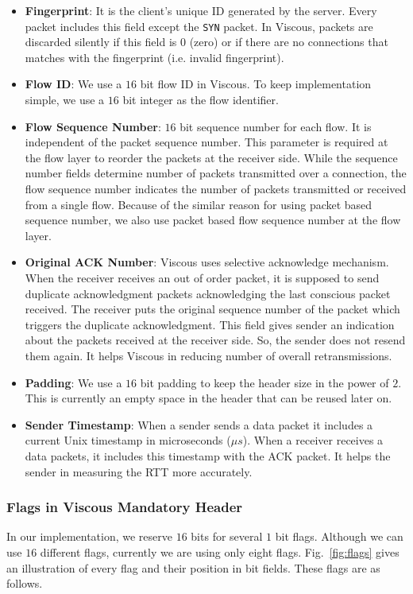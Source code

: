 \begin{itemize}
    \item \textbf{Fingerprint}: It is the client's unique ID generated by the server. Every packet includes this field except the \texttt{SYN} packet. In Viscous, packets are discarded silently if this field is 0 (zero) or if there are no connections that matches with the fingerprint (i.e. invalid fingerprint).
    
    \item \textbf{Flow ID}: We use a $16$ bit flow ID in Viscous. To keep implementation simple, we use a $16$ bit integer as the flow identifier.
    
    \item \textbf{Flow Sequence Number}: $16$ bit sequence number for each flow. It is independent of the packet sequence number. This parameter is required at the flow layer to reorder the packets at the receiver side. While the sequence number fields determine number of packets transmitted over a connection, the flow sequence number indicates the number of packets transmitted or received from a single flow. Because of the similar reason for using packet based sequence number, we also use packet based flow sequence number at the flow layer.
    
    \item \textbf{Original ACK Number}: Viscous uses selective acknowledge mechanism. When the receiver receives an out of order packet, it is supposed to send duplicate acknowledgment packets acknowledging the last conscious packet received. The receiver puts the original sequence number of the packet which triggers the duplicate acknowledgment. This field gives sender an indication about the packets received at the receiver side. So, the sender does not resend them again. It helps Viscous in reducing number of overall retransmissions.
    
    \item \textbf{Padding}: We use a $16$ bit padding to keep the header size in the power of $2$. This is currently an empty space in the header that can be reused later on. 
    
    \item \textbf{Sender Timestamp}: When a sender sends a data packet it includes a current Unix timestamp in microseconds ($\mu s$). When a receiver receives a data packets, it includes this timestamp with the ACK packet. It helps the sender in measuring the RTT more accurately.
\end{itemize}

\subsubsection{Flags in Viscous Mandatory Header}
In our implementation, we reserve $16$ bits for several $1$ bit flags. Although we can use $16$ different flags, currently we are using only eight flags. Fig.~\ref{fig:flags} gives an illustration of every flag and their position in bit fields. These flags are as follows. 

